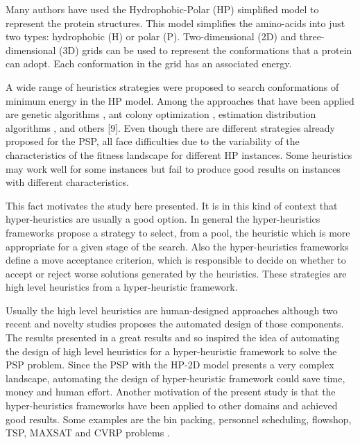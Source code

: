 \documentclass[conference]{IEEEtran}
\begin{document}
Many authors \cite{custodio2004investigation,hsu2003growth,lin2011protein,unger1993genetic,santana2008component,custodio2014multiple, garza2012locality} have used the Hydrophobic-Polar (HP) \cite{lau1989lattice} simplified model to represent the protein structures. This model simplifies the amino-acids into just two types: hydrophobic (H) or polar (P). Two-dimensional (2D) and three-dimensional (3D) grids can be used to represent the conformations that a protein can adopt. Each conformation in the grid has an associated energy. 


A wide range of heuristics strategies were proposed to search  conformations of minimum energy in the HP model. Among the approaches that have been applied are genetic algorithms \cite{unger1993genetic}, ant colony optimization \cite{shmygelska2002ant, shmygelska2003improved}, estimation distribution algorithms \cite{santana2008component}, and others [9]. Even though there are different strategies already proposed for the PSP, all face difficulties due to the variability of the characteristics of the fitness landscape for different HP instances.  Some heuristics may work well for some instances but fail to produce good results on instances with different characteristics. 
  
   This fact motivates the study here presented. It is in this kind of context that hyper-heuristics are usually a good option. In general the hyper-heuristics frameworks propose a strategy to select, from a pool, the heuristic which is more appropriate for a given stage of the search. Also the hyper-heuristics frameworks define a move acceptance criterion, which is responsible to decide on whether to accept or reject worse solutions generated by the heuristics. These strategies are high level heuristics from a hyper-heuristic framework. 
 
 Usually the high level heuristics are human-designed approaches although two recent and novelty studies \cite{sabar2012grammatical,sabar2015automatic} proposes the automated design of those components. The results presented 
 in \cite{sabar2012grammatical}  a great results and so inspired the idea of automating the design of high level heuristics for a hyper-heuristic framework to solve the PSP problem. Since the PSP with the HP-2D model presents a very complex landscape, automating the design of hyper-heuristic framework could save time, money and human effort. Another motivation of the present study is that the hyper-heuristics frameworks have been applied to other domains and achieved good results. Some examples are the bin packing, personnel scheduling, flowshop, TSP, MAXSAT and CVRP problems \cite{sabar2015automatic}.
 
\end{document}

